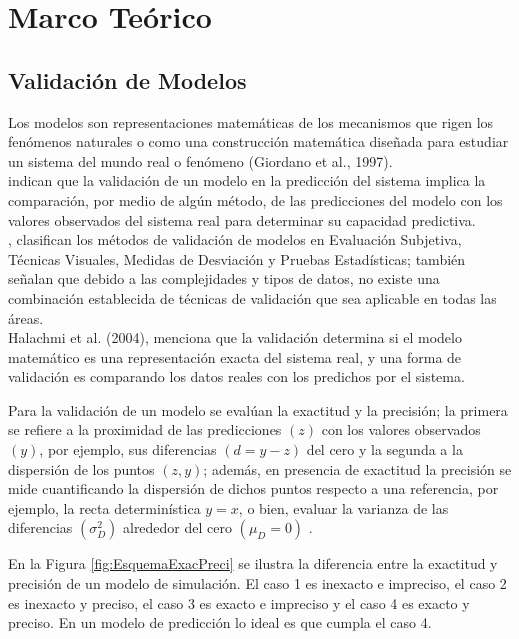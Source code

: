 \section{Marco Teórico}

\subsection{Validación de Modelos}
Los modelos son representaciones matemáticas de los mecanismos que rigen los fenómenos naturales \parencite{tedeschi-2006} o como una construcción matemática diseñada para estudiar un sistema del mundo real o fenómeno (Giordano et al., 1997).\\

\textcite{medina-peralta-2017} indican que la validación de un modelo en la predicción del sistema implica la comparación, por medio de algún método, de las predicciones del modelo con los valores observados del sistema real para determinar su capacidad predictiva.\\

\textcite{mayer-butler-1993}, clasifican los métodos de validación de modelos en Evaluación Subjetiva, Técnicas Visuales, Medidas de Desviación y Pruebas Estadísticas; también señalan que debido a las complejidades y tipos de datos, no existe una combinación establecida de técnicas de validación que sea aplicable en todas las áreas.\\

Halachmi et al. (2004), menciona que la validación determina si el modelo matemático es una representación exacta del sistema real, y una forma de validación es comparando los datos reales con los predichos por el sistema.
\vspace{.5cm}

Para la validación de un modelo se evalúan la exactitud y la precisión; la primera se refiere a la proximidad de las predicciones $( z )$  con los valores observados $( y )$, por ejemplo, sus diferencias $ ( d=y-z ) $ del cero y la segunda a la dispersión de los puntos $ (z, y) $; además, en presencia de exactitud la precisión se mide cuantificando la dispersión de dichos puntos respecto a una referencia, por ejemplo, la recta determinística  $ y=x $, o bien, evaluar la varianza de las diferencias $ (\sigma_{D}^{2}) $ alrededor del cero $ (\mu_{D}=0) $ \parencite{medina-peralta-2017}.
\vspace{.5cm}

En la Figura \ref{fig:EsquemaExacPreci} se ilustra la diferencia entre la exactitud y precisión de un modelo de simulación. El caso 1 es inexacto e impreciso, el caso 2 es inexacto y preciso, el caso 3 es exacto e impreciso y el caso 4 es exacto y preciso. En un modelo de predicción lo ideal es que cumpla el caso 4. 

